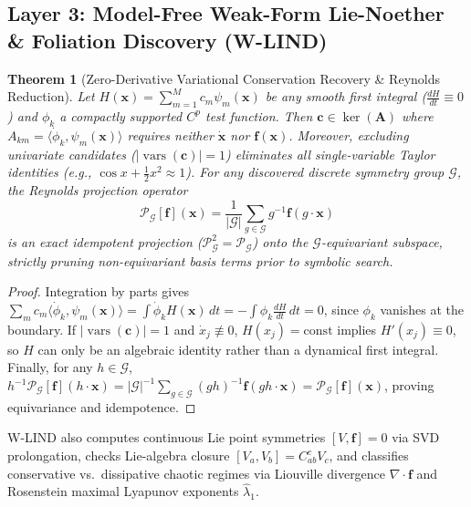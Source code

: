 \documentclass[10pt]{article} %
\newtheorem{theorem}{Theorem}
\begin{document}
\subsection{Layer 3: Model-Free Weak-Form Lie-Noether \& Foliation Discovery (W-LIND)}
\begin{theorem}[Zero-Derivative Variational Conservation Recovery \& Reynolds Reduction]
\label{thm:wlind}
Let $H(\mathbf{x}) = \sum_{m=1}^M c_m \psi_m(\mathbf{x})$ be any smooth first integral ($\frac{dH}{dt}\equiv 0$) and $\phi_k$ a compactly supported $C^p$ test function. Then $\mathbf{c} \in \ker(\mathbf{A})$ where $A_{km} = \langle \dot{\phi}_k, \psi_m(\mathbf{x}) \rangle$ requires neither $\dot{\mathbf{x}}$ nor $\mathbf{f}(\mathbf{x})$. Moreover, excluding univariate candidates ($|\operatorname{vars}(\mathbf{c})| = 1$) eliminates all single-variable Taylor identities (e.g., $\cos x + \frac{1}{2}x^2 \approx 1$). For any discovered discrete symmetry group $\mathcal{G}$, the Reynolds projection operator
\begin{equation}
  \mathcal{P}_{\mathcal{G}}[\mathbf{f}](\mathbf{x}) = \frac{1}{|\mathcal{G}|}\sum_{g \in \mathcal{G}} g^{-1} \mathbf{f}(g\cdot\mathbf{x})
\end{equation}
is an exact idempotent projection ($\mathcal{P}_{\mathcal{G}}^2 = \mathcal{P}_{\mathcal{G}}$) onto the $\mathcal{G}$-equivariant subspace, strictly pruning non-equivariant basis terms prior to symbolic search.
\end{theorem}
\begin{proof}
Integration by parts gives $\sum_m c_m \langle \dot{\phi}_k, \psi_m(\mathbf{x})\rangle = \int \dot{\phi}_k H(\mathbf{x})\,dt = -\int \phi_k \frac{dH}{dt}\,dt = 0$, since $\phi_k$ vanishes at the boundary. If $|\operatorname{vars}(\mathbf{c})|=1$ and $\dot{x}_j \not\equiv 0$, $H(x_j)=\text{const}$ implies $H'(x_j)\equiv 0$, so $H$ can only be an algebraic identity rather than a dynamical first integral. Finally, for any $h \in \mathcal{G}$, $h^{-1}\mathcal{P}_{\mathcal{G}}[\mathbf{f}](h\cdot\mathbf{x}) = |\mathcal{G}|^{-1}\sum_{g\in\mathcal{G}} (gh)^{-1}\mathbf{f}(gh\cdot\mathbf{x}) = \mathcal{P}_{\mathcal{G}}[\mathbf{f}](\mathbf{x})$, proving equivariance and idempotence.
\end{proof}

W-LIND also computes continuous Lie point symmetries $[V, \mathbf{f}]=0$ via SVD prolongation, checks Lie-algebra closure $[V_a, V_b] = C_{ab}^c V_c$, and classifies conservative vs.\ dissipative chaotic regimes via Liouville divergence $\nabla\cdot\mathbf{f}$ and Rosenstein maximal Lyapunov exponents $\hat{\lambda}_1$.
\end{document}
